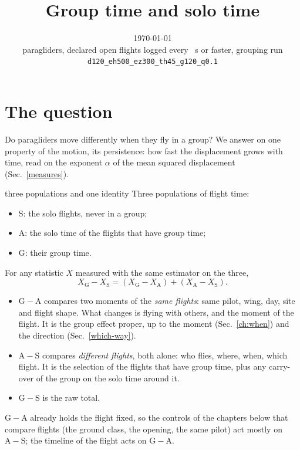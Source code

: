 \documentclass[10pt,a4paper]{article}
\title{\textbf{Group time and solo time}}
\author{}
\date{\today\\ paragliders, declared open flights logged every \DtMax~s or faster, grouping run \texttt{d120\_eh500\_ez300\_th45\_g120\_q0.1}}
\newcommand{\G}{\mathrm{G}}
\newcommand{\A}{\mathrm{A}}
\newcommand{\Sl}{\mathrm{S}}
\begin{document}
\maketitle

\section{The question}\label{question}

Do paragliders move differently when they fly in a group? We answer on one property of the motion, its
persistence: how fast the displacement grows with time, read on the exponent $\alpha$ of the mean squared
displacement (Sec.~\ref{measures}).

\begin{method}{three populations and one identity}
  Three populations of flight time:
  \begin{itemize}
  \item $\Sl$: the solo flights, never in a group;
  \item $\A$: the solo time of the flights that have group time;
  \item $\G$: their group time.
  \end{itemize}
  For any statistic $X$ measured with the same estimator on the three,
  \[ X_\G-X_\Sl=(X_\G-X_\A)+(X_\A-X_\Sl). \]
  \begin{itemize}
  \item $\G-\A$ compares two moments of the \emph{same flights}: same pilot, wing, day, site and flight shape.
    What changes is flying with others, and the moment of the flight. It is the group effect proper, up to the
    moment (Sec.~\ref{ch:when}) and the direction (Sec.~\ref{which-way}).
  \item $\A-\Sl$ compares \emph{different flights}, both alone: who flies, where, when, which flight. It is the
    selection of the flights that have group time, plus any carry-over of the group on the solo time around it.
  \item $\G-\Sl$ is the raw total.
  \end{itemize}
  $\G-\A$ already holds the flight fixed, so the controls of the chapters below that compare flights (the ground
  class, the opening, the same pilot) act mostly on $\A-\Sl$; the timeline of the flight acts on $\G-\A$.
\end{method}
\end{document}
